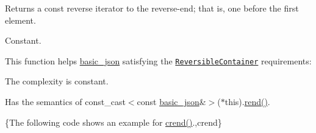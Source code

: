 Returns a const reverse iterator to the reverse-\/end; that is, one before the first element.

  Constant.

This function helps {\ttfamily \hyperlink{classnlohmann_1_1basic__json}{basic\-\_\-json}} satisfying the \href{http://en.cppreference.com/w/cpp/concept/ReversibleContainer}{\tt Reversible\-Container} requirements\-:
\begin{DoxyItemize}
\item The complexity is constant.
\item Has the semantics of {\ttfamily const\-\_\-cast$<$const \hyperlink{classnlohmann_1_1basic__json}{basic\-\_\-json}\&$>$($\ast$this).\hyperlink{classnlohmann_1_1basic__json_aaa160a960dd3dd90856a72b1d8dbe707}{rend()}}.
\end{DoxyItemize}

\{The following code shows an example for {\ttfamily \hyperlink{classnlohmann_1_1basic__json_aa7084e62b93ef0236698b246a58bb2da}{crend()}}.,crend\}

